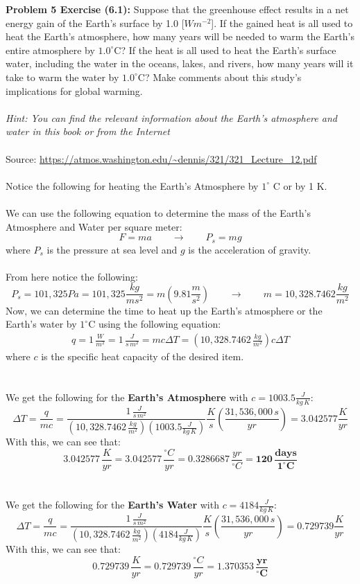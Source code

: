 \documentclass[11pt]{article}
\newenvironment{problem}[1]{\textbf{Problem #1:}}{\newpage}
\begin{document}
	\begin{problem}{5 Exercise (6.1)}
		Suppose that the greenhouse effect results in a net energy gain of the Earth’s surface
		by 1.0 [$Wm^{-2}$]. If the gained heat is all used to heat the Earth’s atmosphere, how many years will be needed to warm the Earth’s entire atmosphere by $1.0^\circ$C? If the heat is all used to heat the Earth’s surface water, including the water in the oceans, lakes, and rivers, how many years will it take to warm the water by $1.0^\circ$C? Make comments about this study’s
		implications for global warming.
		\\ \\
		\textit{Hint: You can find the relevant information about the Earth’s atmosphere and water in
		this book or from the Internet}
		\\ \\
		Source: \url{https://atmos.washington.edu/~dennis/321/321_Lecture_12.pdf}
		\\ \\
		Notice the following for heating the Earth's Atmosphere by $1^\circ$ C or by 1 K.  
		\\ \\
		We can use the following equation to determine the mass of the Earth's Atmosphere and Water per square meter:
		\[F = ma \qquad \rightarrow \qquad P_s = mg \]
		where $P_s$ is the pressure at sea level and $g$ is the acceleration of gravity. 
		\\ \\
		From here notice the following:
		\[P_s = 101,325 Pa = 101,325 \frac{kg}{m s^2} = m \left(9.81\frac{m}{s^2}\right) \qquad \rightarrow \qquad m = 10,328.7462 \frac{kg}{m^2}\]
		Now, we can determine the time to heat up the Earth's atmosphere or the Earth's water by $1^\circ$C using the following equation:
		\begin{align*}
			q = 1\,\frac{W}{m^2} = 1\,\frac{J}{s\,m^2} = mc\Delta T = \left(10,328.7462\,\frac{kg}{m^2} \right)c\Delta T 
		\end{align*}
		where $c$ is the specific heat capacity of the desired item.
		\\ \\ \\
		We get the following for the \textbf{Earth's Atmosphere} with $c = 1003.5 \frac{J}{kg\,K}$:
		\[\Delta T = \frac{q}{mc} = \frac{1\,\frac{J}{s\,m^2}}{\left(10,328.7462\,\frac{kg}{m^2} \right)\left( 1003.5 \frac{J}{kg\,K}\right)} \frac{K}{s} \left(\frac{31,536,000\,s}{yr}\right) = 3.042577 \frac{K}{yr}\]
		With this, we can see that:
		\[3.042577\,\frac{K}{yr} = 3.042577\,\frac{^\circ C}{yr} = 0.3286687\,\frac{yr}{^\circ C} = \boldsymbol{120\,\frac{days}{1^\circ C}}\]
		\\ \\
		We get the following for the \textbf{Earth's Water} with $c = 4184 \frac{J}{kg\,K}$:
		\[\Delta T = \frac{q}{mc} = \frac{1\,\frac{J}{s\,m^2}}{\left(10,328.7462\,\frac{kg}{m^2} \right)\left( 4184 \frac{J}{kg\,K}\right)} \frac{K}{s} \left(\frac{31,536,000\,s}{yr}\right) = 0.729739 \frac{K}{yr}\]
		With this, we can see that:
		\[0.729739\,\frac{K}{yr} = 0.729739\,\frac{^\circ C}{yr} = \boldsymbol{1.370353\,\frac{yr}{^\circ C}}\]
	\end{problem}
\end{document}
